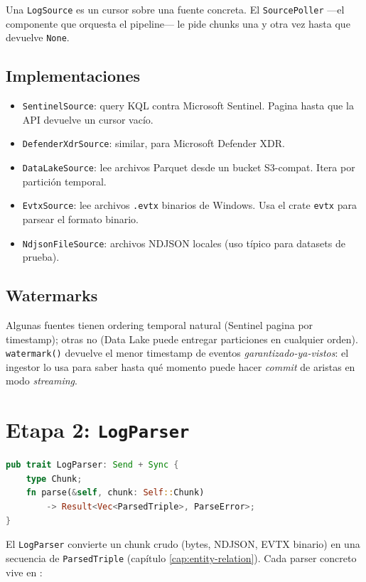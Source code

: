 \noindent
Una \texttt{LogSource} es un cursor sobre una fuente concreta. El
\texttt{SourcePoller} ---el componente que orquesta el pipeline---
le pide chunks una y otra vez hasta que devuelve \texttt{None}.

\subsection{Implementaciones}

\begin{itemize}
    \item \texttt{SentinelSource}: query KQL contra Microsoft
    Sentinel. Pagina hasta que la API devuelve un cursor vacío.
    \item \texttt{DefenderXdrSource}: similar, para Microsoft
    Defender XDR.
    \item \texttt{DataLakeSource}: lee archivos Parquet desde un
    bucket S3-compat. Itera por partición temporal.
    \item \texttt{EvtxSource}: lee archivos \texttt{.evtx} binarios
    de Windows. Usa el crate \texttt{evtx} para parsear el formato
    binario.
    \item \texttt{NdjsonFileSource}: archivos NDJSON locales (uso
    típico para datasets de prueba).
\end{itemize}

\subsection{Watermarks}

Algunas fuentes tienen ordering temporal natural (Sentinel pagina
por timestamp); otras no (Data Lake puede entregar particiones en
cualquier orden). \texttt{watermark()} devuelve el menor timestamp
de eventos \emph{garantizado-ya-vistos}: el ingestor lo usa para
saber hasta qué momento puede hacer \emph{commit} de aristas en
modo \emph{streaming}.

\section{Etapa 2: \texttt{LogParser}}

\begin{lstlisting}[language=Rust]
pub trait LogParser: Send + Sync {
    type Chunk;
    fn parse(&self, chunk: Self::Chunk)
        -> Result<Vec<ParsedTriple>, ParseError>;
}
\end{lstlisting}

\noindent
El \texttt{LogParser} convierte un chunk crudo (bytes, NDJSON, EVTX
binario) en una secuencia de \texttt{ParsedTriple} (capítulo
\ref{cap:entity-relation}). Cada parser concreto vive en
:

